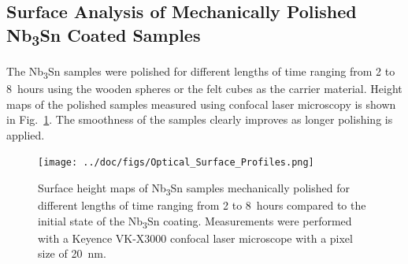 %
\subsection{Surface Analysis of Mechanically Polished Nb\textsubscript{3}Sn Coated Samples}%
\label{subsec:sampleanalysis}%
The Nb\textsubscript{3}Sn samples were polished for different lengths of time ranging from 2 to 8~hours using the wooden spheres or the felt cubes as the carrier material. Height maps of the polished samples measured using confocal laser microscopy is shown in Fig.~\ref{fig:opticalsurfaceprofiles}. The smoothness of the samples clearly improves as longer polishing is applied.

\begin{figure}[t]%
\centering%
\texttt{[image: ../doc/figs/Optical\_Surface\_Profiles.png]}%
\caption{Surface height maps of Nb\textsubscript{3}Sn samples mechanically polished for different lengths of time ranging from 2 to 8~hours compared to the initial state of the Nb\textsubscript{3}Sn coating. Measurements were performed with a Keyence VK-X3000 confocal laser microscope with a pixel size of 20~nm.}%
\label{fig:opticalsurfaceprofiles}%
\end{figure}

%


